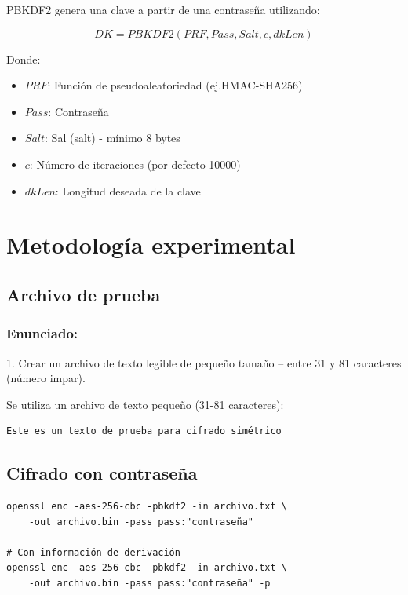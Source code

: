 PBKDF2 genera una clave a partir de una contraseña utilizando:

\begin{equation}
DK = PBKDF2(PRF, Pass, Salt, c, dkLen)
\end{equation}

Donde:
\begin{itemize}
    \item $PRF$: Función de pseudoaleatoriedad (ej.\@ HMAC-SHA256)
    \item $Pass$: Contraseña
    \item $Salt$: Sal (salt) - mínimo 8 bytes
    \item $c$: Número de iteraciones (por defecto 10000)
    \item $dkLen$: Longitud deseada de la clave
\end{itemize}

\section{Metodología experimental}
\subsection{Archivo de prueba}
\subsubsection{Enunciado:}
1. Crear un archivo de texto legible de pequeño tamaño – entre 31 y 81 caracteres (número impar).

Se utiliza un archivo de texto pequeño (31-81 caracteres):

\begin{lstlisting}[caption=Archivo para cifrado simétrico]
Este es un texto de prueba para cifrado simétrico
\end{lstlisting}

\subsection{Cifrado con contraseña}

\begin{lstlisting}[caption=Cifrado con contraseña y PBKDF2]
openssl enc -aes-256-cbc -pbkdf2 -in archivo.txt \
    -out archivo.bin -pass pass:"contraseña" 

# Con información de derivación
openssl enc -aes-256-cbc -pbkdf2 -in archivo.txt \
    -out archivo.bin -pass pass:"contraseña" -p 
\end{lstlisting}

